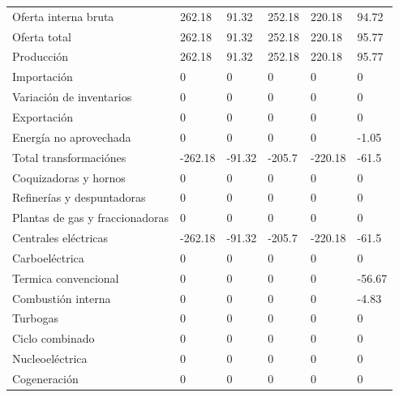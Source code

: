 \documentclass{sener2025}
\begin{document}
\begin{tabladoradoLargo}
\begin{xltabular}{\textwidth}{YZZZZZ}
    Oferta interna bruta & 262.18 & 91.32 & 252.18 & 220.18 & 94.72 \\
    \hspace{1.35em} Oferta total & 262.18 & 91.32 & 252.18 & 220.18 & 95.77 \\
    \hspace{2.7em} Producción & 262.18 & 91.32 & 252.18 & 220.18 & 95.77 \\
    \hspace{2.7em} Importación & 0 & 0 & 0 & 0 & 0 \\
    \hspace{2.7em} Variación de inventarios & 0 & 0 & 0 & 0 & 0 \\
    \hspace{1.35em} Exportación & 0 & 0 & 0 & 0 & 0 \\
    \hspace{1.35em} Energía no aprovechada & 0 & 0 & 0 & 0 & -1.05 \\
    Total transformaciónes & -262.18 & -91.32 & -205.7 & -220.18 & -61.5 \\
    \hspace{1.35em} Coquizadoras y hornos & 0 & 0 & 0 & 0 & 0 \\
    \hspace{1.35em} Refinerías y despuntadoras & 0 & 0 & 0 & 0 & 0 \\
    \hspace{1.35em} Plantas de gas y fraccionadoras & 0 & 0 & 0 & 0 & 0 \\
    \hspace{1.35em} Centrales eléctricas & -262.18 & -91.32 & -205.7 & -220.18 & -61.5 \\
    \hspace{2.7em} Carboeléctrica & 0 & 0 & 0 & 0 & 0 \\
    \hspace{2.7em} Termica convencional & 0 & 0 & 0 & 0 & -56.67 \\
    \hspace{2.7em} Combustión interna & 0 & 0 & 0 & 0 & -4.83 \\
    \hspace{2.7em} Turbogas & 0 & 0 & 0 & 0 & 0 \\
    \hspace{2.7em} Ciclo combinado & 0 & 0 & 0 & 0 & 0 \\
    \hspace{2.7em} Nucleoeléctrica & 0 & 0 & 0 & 0 & 0 \\
    \hspace{2.7em} Cogeneración & 0 & 0 & 0 & 0 & 0 \\

\end{xltabular}
\end{tabladoradoLargo}
\end{document}
